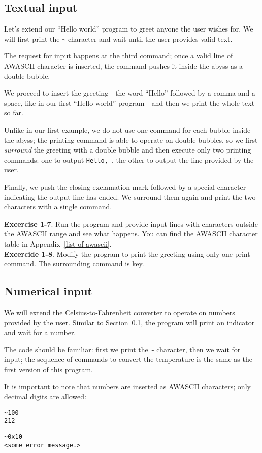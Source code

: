 \documentclass[11pt,a4paper,draft]{book}
\begin{document}
\subsection{Textual input}
\label{textual-input}
Let's extend our \enquote{Hello world} program to greet anyone the
user wishes for. We will first print the \verb|~| character and wait
until the user provides valid text.


The request for input happens at the third command; once a valid line
of AWASCII character is inserted, the command pushes it inside the
abyss as a double bubble.

We proceed to insert the greeting---the word \enquote{Hello} followed
by a comma and a space, like in our first \enquote{Hello world}
program---and then we print the whole text so far.

Unlike in our first example, we do not use one command for each bubble
inside the abyss; the printing command is able to operate on double
bubbles, so we first \emph{surround} the greeting with a double bubble
and then execute only two printing commands: one to output
\verb*|Hello, |, the other to output the line provided by the user.

Finally, we push the closing exclamation mark followed by a special
character indicating the output line has ended. We surround them again
and print the two characters with a single command.

\textbf{Excercise 1-7}. Run the program and provide input lines with
characters outside the AWASCII range and see what happens. You can
find the AWASCII character table in Appendix~\ref{list-of-awascii}. \\
\textbf{Excercide 1-8}. Modify the program to print the greeting using
only one print command. The surrounding command is key.

\subsection{Numerical input}
We will extend the Celsius-to-Fahrenheit converter to operate on
numbers provided by the user. Similar to Section~\ref{textual-input},
the program will print an indicator and wait for a number.


The code should be familiar: first we print the \verb|~| character,
then we wait for input; the sequence of commands to convert the
temperature is the same as the first version of this program.

It is important to note that numbers are inserted as AWASCII
characters; only decimal digits are allowed:
\begin{verbatim}
~100
212
\end{verbatim}
\begin{verbatim}
~0x10
<some error message.>
\end{verbatim}
\end{document}
